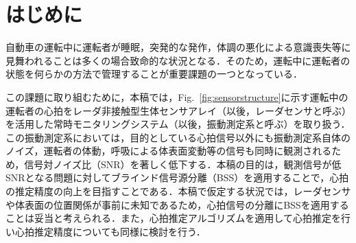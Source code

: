 \documentclass[11pt]{jarticle}
\begin{document}
%









\maketitle

\section{はじめに}
\hspace{1em}自動車の運転中に運転者が睡眠，突発的な発作，体調の悪化による意識喪失等に見舞われることは多くの場合致命的な状況となる．そのため，運転中に運転者の状態を何らかの方法で管理することが重要課題の一つとなっている．

この課題に取り組むために，本稿では，Fig.~\ref{fig:sensorstructure}に示す運転中の運転者の心拍をレーダ非接触型生体センサアレイ（以後，レーダセンサと呼ぶ）を活用した常時モニタリングシステム（以後，振動測定系と呼ぶ）を取り扱う．この振動測定系においては，目的としている心拍信号以外にも振動測定系自体のノイズ，運転者の体動，呼吸による体表面変動等の信号も同時に観測されるため，信号対ノイズ比（SNR）を著しく低下する．本稿の目的は，観測信号が低SNRとなる問題に対してブラインド信号源分離（BSS）\cite{originica}を適用することで，心拍の推定精度の向上を目指すことである．本稿で仮定する状況では，レーダセンサや体表面の位置関係が事前に未知であるため，心拍信号の分離にBSSを適用することは妥当と考えられる．また，心拍推定アルゴリズムを適用して心拍推定を行い心拍推定精度についても同様に検討を行う．
\end{document}
